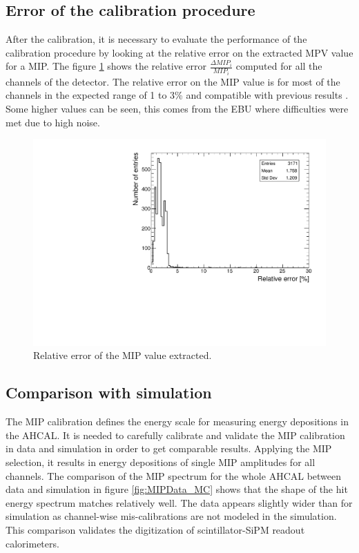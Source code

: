 \subsection{Error of the calibration procedure}

After the calibration, it is necessary to evaluate the performance of the calibration procedure by looking at the relative error on the extracted MPV value for a MIP. The figure \ref{fig:MIPError} shows the relative error $\frac{\Delta MIP_i}{MIP_i}$ computed for all the channels of the detector. The relative error on the MIP value is for most of the channels in the expected range of 1 to 3\% and compatible with previous results \cite{SarahMaster}. Some higher values can be seen, this comes from the EBU where difficulties were met due to high noise.

\begin{figure}[htbp!]
	\centering
	\includegraphics[width=0.7\linewidth]{../Thesis_Plots/EnergyCalib/Plots/RelativeErrorMIP_Combined.pdf}
	\caption{Relative error of the MIP value extracted.} \label{fig:MIPError}
\end{figure}

\subsection{Comparison with simulation}

The MIP calibration defines the energy scale for measuring energy depositions in the AHCAL. It is needed to carefully calibrate and validate the MIP calibration in data and simulation in order to get comparable results. Applying the MIP selection, it results in energy depositions of single MIP amplitudes for all channels. The comparison of the MIP spectrum for the whole AHCAL between data and simulation in figure \ref{fig:MIPData_MC} shows that the shape of the hit energy spectrum matches relatively well. The data appears slightly wider than for simulation as channel-wise mis-calibrations are not modeled in the simulation. This comparison validates the digitization of scintillator-SiPM readout calorimeters.

